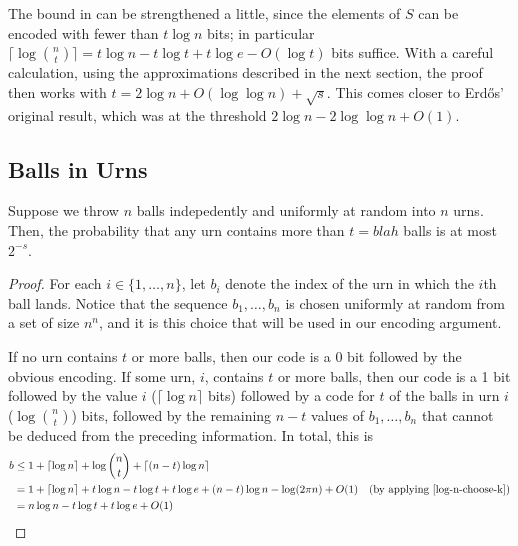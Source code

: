 \documentclass[lotsofwhite]{patmorin}
\begin{document}
\begin{rem}
The bound in  can be strengthened a little, since
the elements of $S$ can be encoded with fewer than $t\log n$ bits; in
particular $\lceil\log\binom{n}{t}\rceil=t\log n - t\log t + t\log e -
O(\log t)$ bits suffice.  With a careful calculation, using the approximations
described in the next section, the proof then
works with $t=2\log n +O(\log\log n) + \sqrt{s}$. This comes closer to
Erdős' original result, which was at the threshold $2\log n - 2\log\log
n + O(1)$.
\end{rem}



\subsection{Balls in Urns}

\begin{thm}
  Suppose we throw $n$ balls indepedently and uniformly at random into $n$
  urns. Then, the probability that any urn contains more than $t=blah$
  balls is at most $2^{-s}$.
\end{thm}

\begin{proof}
  For each $i\in\{1,\ldots,n\}$, let $b_i$ denote the index of the urn in
  which the $i$th ball lands. Notice that the sequence $b_1,\ldots,b_n$
  is chosen uniformly at random from a set of size $n^n$, and it is this
  choice that will be used in our encoding argument.

  If no urn contains $t$ or more balls, then our code is a 0 bit followed
  by the obvious encoding. If some urn, $i$, contains $t$ or more balls,
  then our code is a 1 bit followed by the value $i$ ($\lceil \log
  n\rceil$ bits) followed by a code for $t$ of the balls in urn $i$
  ($\log\binom{n}{t}$) bits, followed by the remaining $n-t$ values of
  $b_1,\ldots,b_n$ that cannot be deduced from the preceding information.
  In total, this is
  \begin{align*}
    b &\le 1 + \lceil\log n\rceil + \log\binom{n}{t} 
           + \lceil(n-t)\log n\rceil \\
     & = 1 + \lceil\log n\rceil + t\log n - t\log t + t\log e  
           + (n-t)\log n - \log(2\pi n) + O(1)
             & \text{(by applying \eqref{log-n-choose-k})} \\
     & = n\log n - t\log t + t\log e + O(1)
  \end{align*}
\end{proof}
\end{document}
